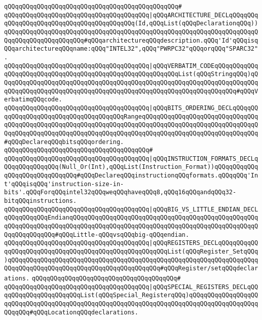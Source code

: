 \verb|qQQqqQQqqQQqqQQqqQQqqQQqqQQqqQQqqQQqqQQqqQQqqQQq#|\newline
\verb|qQQqqQQqqQQqqQQqqQQqqQQqqQQqqQQqqQQqqQQq|\verb#|qQQqARCHITECTURE_DECLqQQqqQQqqQQqqQQqqQQqqQQqqQQqqQQqqQQqqQQqqQQq(Id,qQQqList(qQQqDeclarationqQQq))qQQqqQQqqQQqqQQqqQQqqQQqqQQqqQQqqQQqqQQqqQQqqQQqqQQqqQQqqQQqqQQqqQQqqQQqqQQqqQQqqQQqqQQqqQQq#\verb|#qQQqarchitectureqQQqdescription.qQQq'Id'qQQqisqQQqarchitectureqQQqname:qQQq"INTEL32",qQQq"PWRPC32"qQQqorqQQq"SPARC32".|\newline
\verb|qQQqqQQqqQQqqQQqqQQqqQQqqQQqqQQqqQQqqQQq|\verb#|qQQqVERBATIM_CODEqQQqqQQqqQQqqQQqqQQqqQQqqQQqqQQqqQQqqQQqqQQqqQQqqQQqqQQqqQQqList(qQQqStringqQQq)qQQqqQQqqQQqqQQqqQQqqQQqqQQqqQQqqQQqqQQqqQQqqQQqqQQqqQQqqQQqqQQqqQQqqQQqqQQqqQQqqQQqqQQqqQQqqQQqqQQqqQQqqQQqqQQqqQQqqQQqqQQqqQQqqQQqqQQq#\verb|#qQQqVerbatimqQQqcode.|\newline
\verb|qQQqqQQqqQQqqQQqqQQqqQQqqQQqqQQqqQQqqQQq|\verb#|qQQqBITS_ORDERING_DECLqQQqqQQqqQQqqQQqqQQqqQQqqQQqqQQqqQQqqQQqRangeqQQqqQQqqQQqqQQqqQQqqQQqqQQqqQQqqQQqqQQqqQQqqQQqqQQqqQQqqQQqqQQqqQQqqQQqqQQqqQQqqQQqqQQqqQQqqQQqqQQqqQQqqQQqqQQqqQQqqQQqqQQqqQQqqQQqqQQqqQQqqQQqqQQqqQQqqQQqqQQqqQQqqQQqqQQq#\verb|#qQQqDeclareqQQqbitsqQQqordering.|\newline
\verb|qQQqqQQqqQQqqQQqqQQqqQQqqQQqqQQqqQQqqQQq#|\newline
\verb|qQQqqQQqqQQqqQQqqQQqqQQqqQQqqQQqqQQqqQQq|\verb#|qQQqINSTRUCTION_FORMATS_DECLqQQqqQQqqQQqqQQq(Null_Or(Int),qQQqList(Instruction_Format))qQQqqQQqqQQqqQQqqQQqqQQqqQQqqQQq#\verb|#qQQqDeclareqQQqinstructionqQQqformats.qQQqqQQq'Int'qQQqisqQQq'instruction-size-in-bits'.qQQqForqQQqintel32qQQqweqQQqhaveqQQq8,qQQq16qQQqandqQQq32-bitqQQqinstructions.|\newline
\verb|qQQqqQQqqQQqqQQqqQQqqQQqqQQqqQQqqQQqqQQq|\verb#|qQQqBIG_VS_LITTLE_ENDIAN_DECLqQQqqQQqqQQqEndianqQQqqQQqqQQqqQQqqQQqqQQqqQQqqQQqqQQqqQQqqQQqqQQqqQQqqQQqqQQqqQQqqQQqqQQqqQQqqQQqqQQqqQQqqQQqqQQqqQQqqQQqqQQqqQQqqQQqqQQqqQQqqQQqqQQqqQQq#\verb|#qQQqLittle-qQQqvsqQQqbig-qQQqendian.|\newline
\verb|qQQqqQQqqQQqqQQqqQQqqQQqqQQqqQQqqQQqqQQq|\verb#|qQQqREGISTERS_DECLqQQqqQQqqQQqqQQqqQQqqQQqqQQqqQQqqQQqqQQqqQQqqQQqqQQqqQQqList(qQQqRegister_SetqQQq)qQQqqQQqqQQqqQQqqQQqqQQqqQQqqQQqqQQqqQQqqQQqqQQqqQQqqQQqqQQqqQQqqQQqqQQqqQQqqQQqqQQqqQQqqQQqqQQqqQQqqQQqqQQqqQQq#\verb|#qQQqRegister/setqQQqdeclarations.|\newline
\verb|qQQqqQQqqQQqqQQqqQQqqQQqqQQqqQQqqQQqqQQq#|\newline
\verb|qQQqqQQqqQQqqQQqqQQqqQQqqQQqqQQqqQQqqQQq|\verb#|qQQqSPECIAL_REGISTERS_DECLqQQqqQQqqQQqqQQqqQQqqQQqList(qQQqSpecial_RegisterqQQq)qQQqqQQqqQQqqQQqqQQqqQQqqQQqqQQqqQQqqQQqqQQqqQQqqQQqqQQqqQQqqQQqqQQqqQQqqQQqqQQqqQQqqQQqqQQqqQQq#\verb|#qQQqLocationqQQqdeclarations.|\newline
